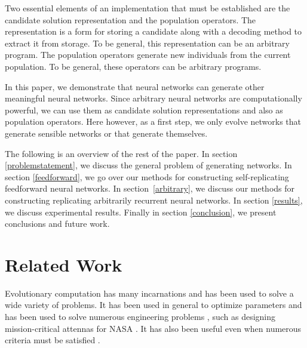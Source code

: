 \documentclass[12pt]{article}
\begin{document}
Two essential elements of an implementation
that must be established
are the candidate solution representation
and the population operators.
The representation is a form for storing a candidate
along with a decoding method
to extract it from storage.
To be general,
this representation can be an arbitrary program.
The population operators
generate new individuals from the current population.
To be general,
these operators can be arbitrary programs.

In this paper,
we demonstrate that neural networks
can generate other meaningful neural networks.
Since arbitrary neural networks are computationally powerful,%
\cite{sperduti1997netpower}
we can use them as candidate solution representations
and also as population operators.
Here however,
as a first step,
we only evolve networks
that generate sensible networks
or that generate themselves.

%
%


The following is an overview of the rest of the paper.
In section \ref{problemstatement},
we discuss the general problem of generating networks.
In section \ref{feedforward},
we go over our methods
for constructing self-replicating feedforward neural networks.
In section~\ref{arbitrary},
we discuss our methods
for constructing replicating arbitrarily recurrent
neural networks.
In section \ref{results},
we discuss experimental results.
Finally in section \ref{conclusion},
we present conclusions and future work.

\section{Related Work}
\label{related}

Evolutionary computation
has many incarnations
and has been used to solve a wide variety of problems.
It has been used in general to optimize parameters
\cite{back1993overview}
and has been used to solve numerous engineering problems
\cite{dasgupta1997evolutionary},
such as designing mission-critical attennas for NASA
\cite{hornby2006automated}.
It has also been useful
even when numerous criteria must be satisfied
\cite{fonseca1995overview}.
\end{document}
